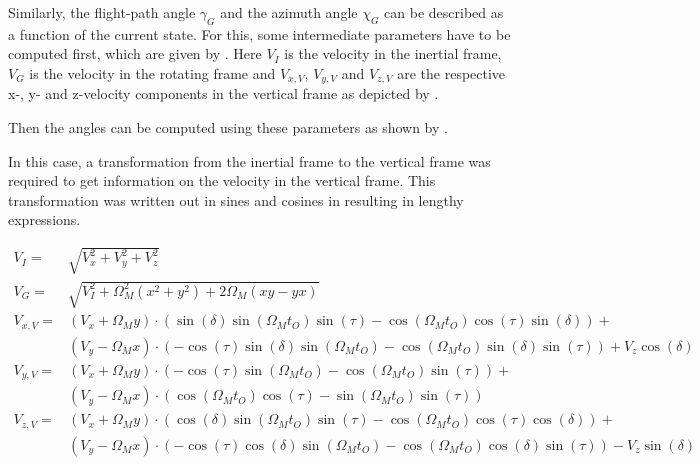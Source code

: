 \noindent
Similarly, the flight-path angle $\gamma_{G}$ and the azimuth angle $\chi_{G}$ can be described as a function of the current state. For this, some intermediate parameters have to be computed first, which are given by . Here $V_{I}$ is the velocity in the inertial frame, $V_{G}$ is the velocity in the rotating frame and $V_{x,V}$, $V_{y,V}$ and $V_{z,V}$ are the respective x-, y- and z-velocity components in the vertical frame as depicted by .

Then the angles can be computed using these parameters as shown by .


In this case, a transformation from the inertial frame to the vertical frame was required to get information on the velocity in the vertical frame. This transformation was written out in sines and cosines in  resulting in lengthy expressions. 

\begin{equation} \label{eq:intermediateParameters}
\begin{split}
V_{I}=&\sqrt{V_{x}^{2}+V_{y}^{2}+V_{z}^{2}}\\
V_{G}=&\sqrt{V_{I}^{2}+\Omega_{M}^{2}\left(x^{2}+y^{2}\right)+2\Omega_{M}\left(xy-yx\right)}\\
V_{x,V}=&\left(V_{x}+\Omega_{M}y\right)\cdot \left(\sin\left(\delta\right)\sin\left(\Omega_{M}t_{O}\right)\sin\left(\tau\right)-\cos\left(\Omega_{M}t_{O}\right)\cos\left(\tau\right)\sin\left(\delta	\right)\right)+\\
&\left(V_{y}-\Omega_{M}x\right)\cdot \left(-\cos\left(\tau\right)\sin\left(\delta\right)\sin\left(\Omega_{M}t_{O}\right)-\cos\left(\Omega_{M}t_{O}\right)\sin\left(\delta\right)\sin\left(\tau\right)\right)+V_{z}\cos\left(\delta\right)\\
V_{y,V}=&\left(V_{x}+\Omega_{M}y\right)\cdot \left(-\cos\left(\tau\right)\sin\left(\Omega_{M}t_{O}\right)-\cos\left(\Omega_{M}t_{O}\right)\sin\left(\tau\right)\right)+\\
&\left(V_{y}-\Omega_{M}x\right)\cdot \left(\cos\left(\Omega_{M}t_{O}\right)\cos\left(\tau\right)-\sin\left(\Omega_{M}t_{O}\right)\sin\left(\tau\right)\right)\\
V_{z,V}=&\left(V_{x}+\Omega_{M}y\right)\cdot \left(\cos\left(\delta\right)\sin\left(\Omega_{M}t_{O}\right)\sin\left(\tau\right)-\cos\left(\Omega_{M}t_{O}\right)\cos\left(\tau\right)\cos\left(\delta	\right)\right)+\\
&\left(V_{y}-\Omega_{M}x\right)\cdot \left(-\cos\left(\tau\right)\cos\left(\delta\right)\sin\left(\Omega_{M}t_{O}\right)-\cos\left(\Omega_{M}t_{O}\right)\cos\left(\delta\right)\sin\left(\tau\right)\right)-V_{z}\sin\left(\delta\right)\\
\end{split}
\end{equation}

